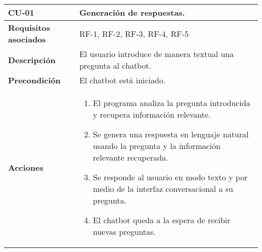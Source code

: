 \begin{longtable}[H]{@{}ll@{}}
	\toprule
	\begin{minipage}[b]{0.23\columnwidth}\raggedright\strut
		\textbf{CU-01}\strut
	\end{minipage} & \begin{minipage}[b]{0.71\columnwidth}\raggedright\strut
		\textbf{Generación de respuestas.}\strut
	\end{minipage}\tabularnewline
	\midrule
	\endhead  
	\begin{minipage}[t]{0.23\columnwidth}\raggedright\strut
		\textbf{Requisitos asociados}\strut
	\end{minipage} & \begin{minipage}[t]{0.71\columnwidth}\raggedright\strut
		RF-1, RF-2, RF-3, RF-4, RF-5\strut
	\end{minipage}\tabularnewline
	\begin{minipage}[t]{0.23\columnwidth}\raggedright\strut
		\textbf{Descripción}\strut
	\end{minipage} & \begin{minipage}[t]{0.71\columnwidth}\raggedright\strut
		El usuario introduce de manera textual una pregunta al chatbot.\strut
	\end{minipage}\tabularnewline
	\begin{minipage}[t]{0.23\columnwidth}\raggedright\strut
		\textbf{Precondición}\strut
	\end{minipage} & \begin{minipage}[t]{0.71\columnwidth}\raggedright\strut
		El chatbot está iniciado.\strut
	\end{minipage}\tabularnewline
	\begin{minipage}[t]{0.23\columnwidth}\raggedright\strut
		\textbf{Acciones}\strut
	\end{minipage} & \begin{minipage}[t]{0.71\columnwidth}\raggedright\strut
		\begin{enumerate}
			\def\labelenumi{\arabic{enumi}.}
			\tightlist
			\item El programa analiza la pregunta introducida y recupera información relevante.
                \item Se genera una respuesta en lenguaje natural usando la pregunta y la información relevante recuperada.
			\item Se responde al usuario en modo texto y por medio de la interfaz conversacional a su pregunta. 
			\item
			El chatbot queda a la espera de recibir nuevas preguntas.

\end{enumerate}
\end{minipage}
\end{longtable}
